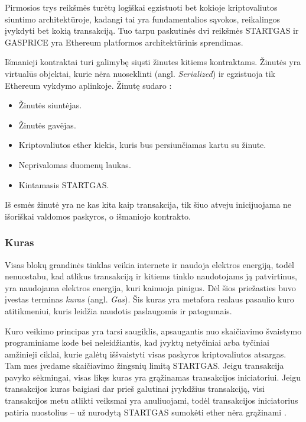 \documentclass{VUMIFPSkursinis}
\begin{document}
Pirmosios trys reikšmės turėtų logiškai egzistuoti bet kokioje kriptovaliutos siuntimo architektūroje, kadangi tai yra fundamentalios sąvokos, reikalingos įvykdyti bet kokią transakciją. Tuo tarpu paskutinės dvi reikšmės STARTGAS ir GASPRICE yra Ethereum platformos architektūrinis sprendimas. 

Išmanieji kontraktai turi galimybę siųsti žinutes kitiems kontraktams. Žinutės yra virtualūs objektai, kurie nėra nuoseklinti (angl. \textit{Serialized}) ir egzistuoja tik Ethereum vykdymo aplinkoje. Žinutę sudaro \cite{buterin2014next}:
\begin{itemize}
    \item Žinutės siuntėjas.
    \item Žinutės gavėjas.
    \item Kriptovaliutos ether kiekis, kuris bus persiunčiamas kartu su žinute.
    \item Neprivalomas duomenų laukas.
    \item Kintamasis STARTGAS.
\end{itemize}

Iš esmės žinutė yra ne kas kita kaip transakcija, tik šiuo atveju inicijuojama ne išoriškai valdomos paskyros, o išmaniojo kontrakto.

\subsubsection{Kuras}
Visas blokų grandinės tinklas veikia internete ir naudoja elektros energiją, todėl nenuostabu, kad atlikus transakciją ir kitiems tinklo naudotojams ją patvirtinus, yra naudojama elektros energija, kuri kainuoja pinigus. Dėl šios priežasties buvo įvestas terminas \textit{kuras} (angl. \textit{Gas}). Šis kuras yra metafora realaus pasaulio kuro atitikmeniui, kuris leidžia naudotis paslaugomis ir patogumais. 

Kuro veikimo principas yra tarsi saugiklis, apsaugantis nuo skaičiavimo švaistymo programiniame kode bei neleidžiantis, kad įvyktų netyčiniai arba tyčiniai amžinieji ciklai, kurie galėtų iššvaistyti visas paskyros kriptovaliutos atsargas. Tam mes įvedame skaičiavimo žingsnių limitą STARTGAS. Jeigu transakcija pavyko sėkmingai, visas likęs kuras yra grąžinamas transakcijos iniciatoriui. Jeigu transakcijos kuras baigiasi dar prieš galutinai įvykdžius transakciją, visi transakcijos metu atlikti veiksmai yra anuliuojami, todėl transakcijos iniciatorius patiria nuostolius – už nurodytą STARTGAS sumokėti ether nėra grąžinami \cite{fekkes2018comparing}.
\end{document}
